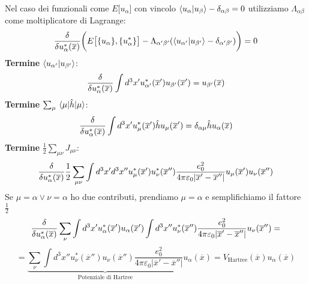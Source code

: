 \vspace{1.0cm}
\newline
{}
\vspace{1.0cm}

\noindent Nel caso dei funzionali come $E\big[u_\alpha\big]$ con vincolo $\ip{u_\alpha}{u_\beta}-\delta_{\alpha\beta}=0$ utilizziamo $\Lambda_{\alpha\beta}$ come moltiplicatore di Lagrange:
\begin{equation*}
    \functionalderivative{u_\alpha^*(\overline x)}\bigg(E\big[\{u_\alpha\},\{u^*_\alpha\}\big]-\Lambda_{\alpha'\beta'}(\ip{u_{\alpha'}}{u_{\beta'}}-\delta_{\alpha'\beta'})\bigg)=0
\end{equation*}
\textbf{Termine} $\ip{u_{\alpha'}}{u_{\beta'}}$:
\begin{equation*}
    \functionalderivative{u_\alpha^*(\overline x)}\int d^3x'u_{\alpha'}^*(\overline{x}')u_{\beta'}(\overline{x}')=u_{\beta'}(\overline x)
\end{equation*}
\textbf{Termine} $\sum_{\mu}\mel{\mu}{\hat h}{\mu}$:
\begin{equation*}
    \functionalderivative{u_\alpha^*(\overline x)}\int d^3x'u_\mu^*(\overline{x}')\hat h u_\mu(\overline{x}')=\delta_{\alpha\mu}\hat h u_\alpha(\overline x)
\end{equation*}
\textbf{Termine} $\frac 12\sum_{\mu\nu}J_{\mu\nu}$:
\begin{equation*}
    \functionalderivative{u_\alpha^*(\overline x)}\frac 12 \sum_{\mu\nu}\int d^3x' d^3x''u_\mu^*(\overline{x}')u_\nu^*(\overline{x}'')\frac{e_0^2}{4\pi\varepsilon_0|\overline{x}'-\overline{x}''|}u_\mu({\overline{x}'})u_\nu(\overline{x}'')
\end{equation*}
Se $\mu=\alpha \vee \nu=\alpha$ ho due contributi, prendiamo $\mu=\alpha$ e semplifichiamo il fattore $\frac 12$
\begin{equation*}
    \functionalderivative{u_\alpha^*(\overline x)} \sum_{\nu}\int d^3x' u_\alpha^*(\overline{x}')u_\alpha(\overline{x}') \int d^3x''u_\nu^*(\overline{x}'')\frac{e_0^2}{4\pi\varepsilon_0|\overline{x}'-\overline{x}''|}u_\nu(\overline{x}'') =
\end{equation*}
\begin{equation*}
    = \underbrace{\sum_{\nu}\int d^3x''u_\nu^*(\overline{x}'')u_\nu(\overline{x}'')\frac{e_0^2}{4\pi\varepsilon_0|\overline{x}'-\overline{x}''|}}_{\text{Potenziale di Hartree}}u_\alpha(\overline x)=V_{\text{Hartree}}(\overline x)u_\alpha(\overline x)
\end{equation*}
